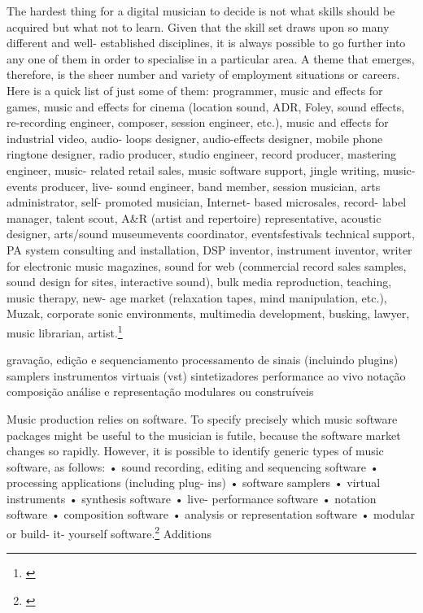 {\begin{citacao}


The hardest thing for a digital musician to decide is not what skills should be acquired but what not to learn. Given that the skill set draws upon so many different and well- established disciplines, it is always possible to go further into any one of them in order to specialise in a particular area. A theme that emerges, therefore, is the sheer number and variety of employment situations or careers. Here is a quick list of just some of them: programmer, music and effects for games, music and effects for cinema (location sound, ADR, Foley, sound effects, re-recording engineer, composer, session engineer, etc.), music and effects for industrial video, audio- loops designer, audio-effects designer, mobile phone ringtone designer, radio producer, studio engineer, record producer, mastering engineer, music- related retail sales, music software support, jingle writing, music- events producer, live- sound engineer, band member, session musician, arts administrator, self- promoted musician, Internet- based microsales, record- label manager, talent scout, A\&R (artist and repertoire) representative, acoustic designer, arts/sound museum\/events coordinator, events\/festivals technical support, PA system consulting and installation, DSP inventor, instrument inventor, writer for electronic music magazines, sound for web (commercial record sales samples, sound design for sites, interactive sound), bulk media reproduction, teaching, music therapy, new- age market (relaxation tapes, mind manipulation, etc.), Muzak, corporate sonic environments, multimedia development, busking, lawyer, music librarian, artist.\footnote{\cite[191]{Hugill2012}}
\end{citacao}


gravação, edição e sequenciamento
processamento de sinais (incluindo plugins)
samplers
instrumentos virtuais (vst)
sintetizadores
performance ao vivo
notação
composição
análise e representação
modulares ou construíveis

\begin{citacao}
Music production relies on software. To specify precisely which music software packages might be useful to the musician is futile, because the software market changes so rapidly. However, it is possible to identify generic types of music software, as follows:
• sound recording, editing and sequencing software • processing applications (including plug- ins) • software samplers • virtual instruments • synthesis software • live- performance software • notation software • composition software • analysis or representation software • modular or build- it- yourself software.\footnote{\cite[195]{Hugill2012}}
Additions
\end{citacao}


}
